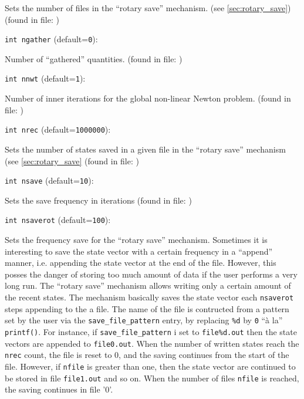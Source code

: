 Sets the number of files in the ``rotary save'' mechanism. 
(see \ref{sec:rotary_save})
 (found in file: \verb++)
\item\verb+int ngather+ {\rm(default=\verb|0|)}:

Number of ``gathered'' quantities.
 (found in file: \verb++)
\item\verb+int nnwt+ {\rm(default=\verb|1|)}:

Number of inner iterations for the global non-linear
Newton  problem. 
 (found in file: \verb++)
\item\verb+int nrec+ {\rm(default=\verb|1000000|)}:

Sets the number of states saved in a given file
in the ``rotary save'' mechanism (see \ref{sec:rotary_save}
 (found in file: \verb++)
\item\verb+int nsave+ {\rm(default=\verb|10|)}:

Sets the save frequency in iterations 
 (found in file: \verb++)
\item\verb+int nsaverot+ {\rm(default=\verb|100|)}:

Sets the frequency save for the ``rotary save'' mechanism. 
\label{sec:rotary_save}
Sometimes it is interesting to save the state vector with a certain
frequency in a ``append'' manner, i.e. appending the state vector at
the end of the file. However, this posses the danger of storing too
much amount of data if the user performs a very long run. The ``rotary
save'' mechanism allows writing only a certain amount of the recent
states. The mechanism basically saves the state vector each
\verb+nsaverot+ steps appending to the a file. The name of the file is
contructed from a pattern set by the user via the
\verb+save_file_pattern+ entry, by replacing \verb+%d+ 
by \verb+0+ ``\`a la'' \verb+printf()+. For instance, if
\verb+save_file_pattern+ i set to \verb+file%d.out+ 
then the state vectors are appended to \verb+file0.out+.  When the
number of written states reach the \verb+nrec+ count, the file is
reset to 0, and the saving continues from the start of the
file. However, if \verb+nfile+ is greater than one, then the state
vector are continued to be stored in file \verb+file1.out+ and so
on. When the number of files \verb+nfile+ is reached, the saving
continues in file '0'.

